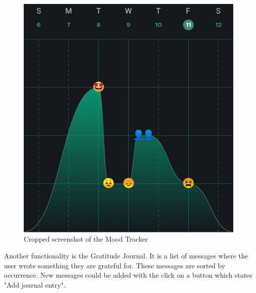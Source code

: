 \begin{figure}[ht]
  \begin{center}
    \includegraphics[width=1\columnwidth]{files/moodtracker.png}
    \caption{\label{fig:moodtracker} Cropped screenshot of the Mood Tracker}
  \end{center}
\end{figure}

Another functionality is the Gratitude Journal.
It is a list of messages where the user wrote something they are grateful for.
These messages are sorted by occurrence. 
New messages could be added with the click on a button which states "Add journal entry".









